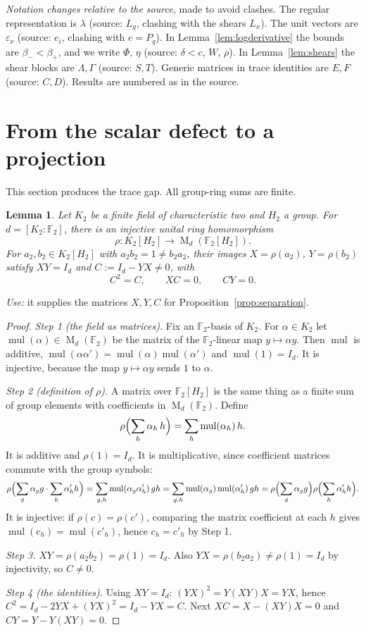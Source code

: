\documentclass[11pt]{article}
\newtheorem{lemma}[theorem]{Lemma}
\theoremstyle{remark}
\numberwithin{equation}{section}
\newcommand{\F}{\mathbb F}
\newcommand{\Mat}{\operatorname{M}}
\newcommand{\mul}{\operatorname{mul}}
\begin{document}
\emph{Notation changes relative to the source,} made to avoid clashes. The regular representation is $\lambda$ (source: $L_g$, clashing with the shears $L_x$). The unit vectors are $\varepsilon_\nu$ (source: $e_i$, clashing with $e=P_q$). In Lemma~\ref{lem:logderivative} the bounds are $\beta_-<\beta_+$, and we write $\Phi$, $\eta$ (source: $\delta<c$, $W$, $\rho$). In Lemma~\ref{lem:shears} the shear blocks are $\Lambda,\Gamma$ (source: $S,T$). Generic matrices in trace identities are $E,F$ (source: $C,D$). Results are numbered as in the source.

\section{From the scalar defect to a projection}
\label{sec:projection}

This section produces the trace gap. All group-ring sums are finite.

\begin{lemma}\label{lem:binary}
Let $K_2$ be a finite field of characteristic two and $H_2$ a group.
For $d=[K_2:\F_2]$, there is an injective unital ring homomorphism
\[
 \rho:K_2[H_2]\longrightarrow\Mat_d(\F_2[H_2]).
\]
For $a_2,b_2\in K_2[H_2]$ with $a_2b_2=1\ne b_2a_2$, their images $X=\rho(a_2)$, $Y=\rho(b_2)$ satisfy
$XY=I_d$ and $C:=I_d-YX\ne0$, with
\begin{equation}\label{eq:defect}
 C^2=C,\qquad XC=0,\qquad CY=0.
\end{equation}
\end{lemma}

\emph{Use:} it supplies the matrices $X,Y,C$ for Proposition~\ref{prop:separation}.

\begin{proof}
\emph{Step 1 (the field as matrices).} Fix an $\F_2$-basis of $K_2$. For $\alpha\in K_2$ let $\mul(\alpha)\in\Mat_d(\F_2)$ be the matrix of the $\F_2$-linear map $y\mapsto\alpha y$. Then $\mul$ is additive, $\mul(\alpha\alpha')=\mul(\alpha)\mul(\alpha')$ and $\mul(1)=I_d$. It is injective, because the map $y\mapsto\alpha y$ sends $1$ to $\alpha$.

\emph{Step 2 (definition of $\rho$).} A matrix over $\F_2[H_2]$ is the same thing as a finite sum of group elements with coefficients in $\Mat_d(\F_2)$. Define
\[
 \rho\Bigl(\sum_h\alpha_h\,h\Bigr)=\sum_h\mul(\alpha_h)\,h .
\]
It is additive and $\rho(1)=I_d$. It is multiplicative, since coefficient matrices commute with the group symbols:
\[
 \rho\Bigl(\sum_g\alpha_gg\cdot\sum_h\alpha'_hh\Bigr)
 =\sum_{g,h}\mul(\alpha_g\alpha'_h)\,gh
 =\sum_{g,h}\mul(\alpha_g)\mul(\alpha'_h)\,gh
 =\rho\Bigl(\sum_g\alpha_gg\Bigr)\rho\Bigl(\sum_h\alpha'_hh\Bigr).
\]
It is injective: if $\rho(c)=\rho(c')$, comparing the matrix coefficient at each $h$ gives $\mul(c_h)=\mul(c'_h)$, hence $c_h=c'_h$ by Step 1.

\emph{Step 3.} $XY=\rho(a_2b_2)=\rho(1)=I_d$. Also $YX=\rho(b_2a_2)\ne\rho(1)=I_d$ by injectivity, so $C\ne0$.

\emph{Step 4 (the identities).} Using $XY=I_d$: $(YX)^2=Y(XY)X=YX$, hence $C^2=I_d-2YX+(YX)^2=I_d-YX=C$. Next $XC=X-(XY)X=0$ and $CY=Y-Y(XY)=0$.
\end{proof}
\end{document}
